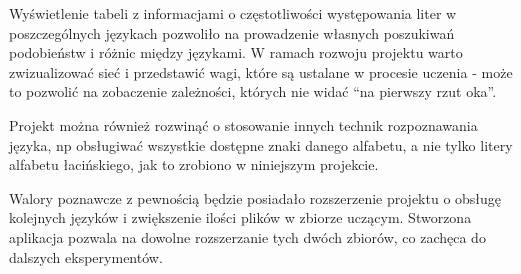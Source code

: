\documentclass[journal]{IEEEtran}
\begin{document}
Wyświetlenie tabeli z informacjami o częstotliwości występowania liter w poszczególnych językach pozwoliło na prowadzenie
własnych poszukiwań podobieństw i różnic między językami. W ramach rozwoju projektu warto zwizualizować sieć i przedstawić
wagi, które są ustalane w procesie uczenia - może to pozwolić na zobaczenie zależności, których nie widać ``na pierwszy
rzut oka''.

Projekt można również rozwinąć o stosowanie innych technik rozpoznawania języka, np obsługiwać wszystkie dostępne znaki
danego alfabetu, a nie tylko litery alfabetu łacińskiego, jak to zrobiono w niniejszym projekcie.

Walory poznawcze z pewnością będzie posiadało rozszerzenie projektu o obsługę kolejnych języków i zwiększenie ilości plików
w zbiorze uczącym. Stworzona aplikacja pozwala na dowolne rozszerzanie tych dwóch zbiorów, co zachęca do dalszych
eksperymentów.



%


\ifCLASSOPTIONcaptionsoff
  \newpage
\fi


\end{document}
